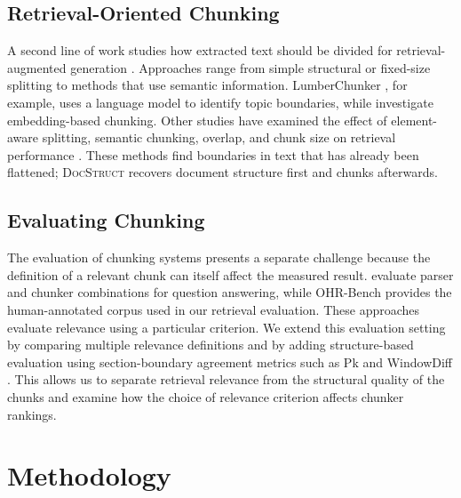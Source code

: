 \documentclass[11pt]{article}
\newcommand{\ds}{\textsc{DocStruct}}
\begin{document}
\subsection{Retrieval-Oriented Chunking}

A second line of work studies how extracted text should be divided for retrieval-augmented generation \citep{lewis2020rag}. Approaches range from simple structural or fixed-size splitting to methods that use semantic information. LumberChunker \citep{duarte2024lumberchunker}, for example, uses a language model to identify topic boundaries, while \citet{smith2024chunking} investigate embedding-based chunking. Other studies have examined the effect of element-aware splitting, semantic chunking, overlap, and chunk size on retrieval performance \citep{jimeno2024financialchunking, chunkingcost2026, chunkingqa2026, rethinkingchunksize2025}. These methods find boundaries in text that has already been flattened; \ds{} recovers document structure first and chunks afterwards.

\subsection{Evaluating Chunking}

The evaluation of chunking systems presents a separate challenge because the definition of a relevant chunk can itself affect the measured result. \citet{elbachyr2026empirical} evaluate parser and chunker combinations for question answering, while OHR-Bench \citep{zhang2025ocrhindersrag} provides the human-annotated corpus used in our retrieval evaluation. These approaches evaluate relevance using a particular criterion. We extend this evaluation setting by comparing multiple relevance definitions and by adding structure-based evaluation using section-boundary agreement metrics such as Pk \citep{beeferman1999statistical} and WindowDiff \citep{pevzner2002critique}. This allows us to separate retrieval relevance from the structural quality of the chunks and examine how the choice of relevance criterion affects chunker rankings.

\section{Methodology}
\label{sec:method}
\end{document}
